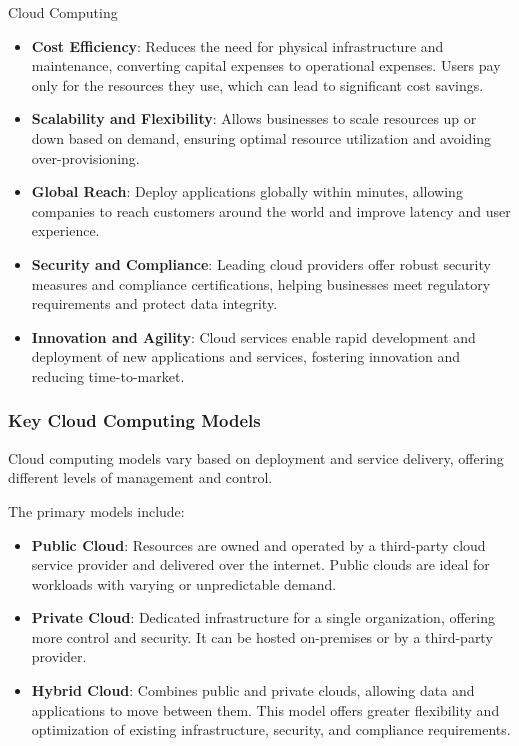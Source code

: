 \begin{notes}{Cloud Computing}
\begin{highlight}
        \begin{itemize}
            \item \textbf{Cost Efficiency}: Reduces the need for physical infrastructure and maintenance, converting capital expenses to operational expenses. Users pay only for the resources they use, 
            which can lead to significant cost savings.
            \item \textbf{Scalability and Flexibility}: Allows businesses to scale resources up or down based on demand, ensuring optimal resource utilization and avoiding over-provisioning.
            \item \textbf{Global Reach}: Deploy applications globally within minutes, allowing companies to reach customers around the world and improve latency and user experience.
            \item \textbf{Security and Compliance}: Leading cloud providers offer robust security measures and compliance certifications, helping businesses meet regulatory requirements and protect data integrity.
            \item \textbf{Innovation and Agility}: Cloud services enable rapid development and deployment of new applications and services, fostering innovation and reducing time-to-market.
        \end{itemize}
    
    \end{highlight}
    
    \subsubsection*{Key Cloud Computing Models}
    
    Cloud computing models vary based on deployment and service delivery, offering different levels of management and control.
    
    \begin{highlight}
    
        The primary models include:
        
        \begin{itemize}
            \item \textbf{Public Cloud}: Resources are owned and operated by a third-party cloud service provider and delivered over the internet. Public clouds are ideal for workloads with varying or unpredictable demand.
            \item \textbf{Private Cloud}: Dedicated infrastructure for a single organization, offering more control and security. It can be hosted on-premises or by a third-party provider.
            \item \textbf{Hybrid Cloud}: Combines public and private clouds, allowing data and applications to move between them. This model offers greater flexibility and optimization of existing 
            infrastructure, security, and compliance requirements.
        \end{itemize}
    

\end{highlight}
\end{notes}
